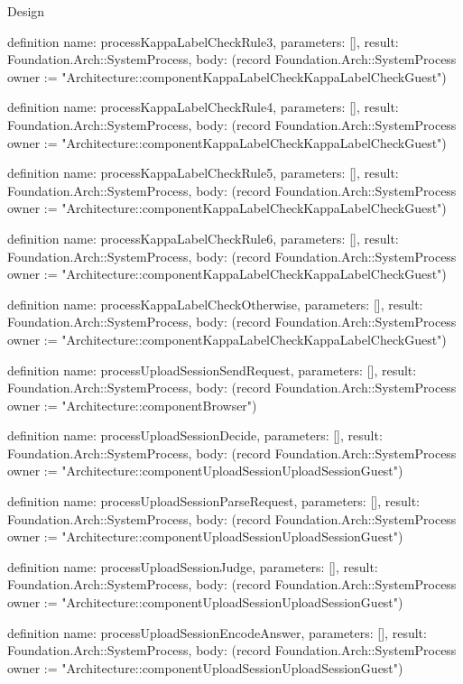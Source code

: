 \begin{lexlean}{Design}
\begin{semanticmodule}
definition{
  name: processKappaLabelCheckRule3,
  parameters: [],
  result: Foundation.Arch::SystemProcess,
  body: (record Foundation.Arch::SystemProcess {owner := "Architecture::componentKappaLabelCheckKappaLabelCheckGuest"})
}

definition{
  name: processKappaLabelCheckRule4,
  parameters: [],
  result: Foundation.Arch::SystemProcess,
  body: (record Foundation.Arch::SystemProcess {owner := "Architecture::componentKappaLabelCheckKappaLabelCheckGuest"})
}

definition{
  name: processKappaLabelCheckRule5,
  parameters: [],
  result: Foundation.Arch::SystemProcess,
  body: (record Foundation.Arch::SystemProcess {owner := "Architecture::componentKappaLabelCheckKappaLabelCheckGuest"})
}

definition{
  name: processKappaLabelCheckRule6,
  parameters: [],
  result: Foundation.Arch::SystemProcess,
  body: (record Foundation.Arch::SystemProcess {owner := "Architecture::componentKappaLabelCheckKappaLabelCheckGuest"})
}

definition{
  name: processKappaLabelCheckOtherwise,
  parameters: [],
  result: Foundation.Arch::SystemProcess,
  body: (record Foundation.Arch::SystemProcess {owner := "Architecture::componentKappaLabelCheckKappaLabelCheckGuest"})
}

definition{
  name: processUploadSessionSendRequest,
  parameters: [],
  result: Foundation.Arch::SystemProcess,
  body: (record Foundation.Arch::SystemProcess {owner := "Architecture::componentBrowser"})
}

definition{
  name: processUploadSessionDecide,
  parameters: [],
  result: Foundation.Arch::SystemProcess,
  body: (record Foundation.Arch::SystemProcess {owner := "Architecture::componentUploadSessionUploadSessionGuest"})
}

definition{
  name: processUploadSessionParseRequest,
  parameters: [],
  result: Foundation.Arch::SystemProcess,
  body: (record Foundation.Arch::SystemProcess {owner := "Architecture::componentUploadSessionUploadSessionGuest"})
}

definition{
  name: processUploadSessionJudge,
  parameters: [],
  result: Foundation.Arch::SystemProcess,
  body: (record Foundation.Arch::SystemProcess {owner := "Architecture::componentUploadSessionUploadSessionGuest"})
}

definition{
  name: processUploadSessionEncodeAnswer,
  parameters: [],
  result: Foundation.Arch::SystemProcess,
  body: (record Foundation.Arch::SystemProcess {owner := "Architecture::componentUploadSessionUploadSessionGuest"})
}


\end{semanticmodule}
\end{lexlean}
